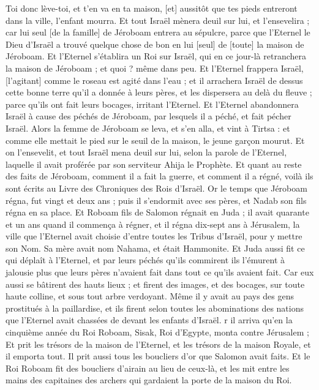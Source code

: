\begin{multicols}{2}
Toi donc lève-toi, et t'en va en ta maison, [et] aussitôt que tes pieds entreront dans la ville, l'enfant mourra.
Et tout Israël mènera deuil sur lui, et l'ensevelira ; car lui seul [de la famille] de Jéroboam entrera au sépulcre, parce que l'Eternel le Dieu d'Israël a trouvé quelque chose de bon en lui [seul] de [toute] la maison de Jéroboam.
Et l'Eternel s'établira un Roi sur Israël, qui en ce jour-là retranchera la maison de Jéroboam ; et quoi ? même dans peu.
Et l'Eternel frappera Israël, [l'agitant] comme le roseau est agité dans l'eau ; et il arrachera Israël de dessus cette bonne terre qu'il a donnée à leurs pères, et les dispersera au delà du fleuve ; parce qu'ils ont fait leurs bocages, irritant l'Eternel.
Et l'Eternel abandonnera Israël à cause des péchés de Jéroboam, par lesquels il a péché, et fait pécher Israël.
Alors la femme de Jéroboam se leva, et s'en alla, et vint à Tirtsa : et comme elle mettait le pied sur le seuil de la maison, le jeune garçon mourut.
Et on l'ensevelit, et tout Israël mena deuil sur lui, selon la parole de l'Eternel, laquelle il avait proférée par son serviteur Ahija le Prophète.
Et quant au reste des faits de Jéroboam, comment il a fait la guerre, et comment il a régné, voilà ils sont écrits au Livre des Chroniques des Rois d'Israël.
Or le temps que Jéroboam régna, fut vingt et deux ans ; puis il s'endormit avec ses pères, et Nadab son fils régna en sa place.
Et Roboam fils de Salomon régnait en Juda ; il avait quarante et un ans quand il commença à régner, et il régna dix-sept ans à Jérusalem, la ville que l'Eternel avait choisie d'entre toutes les Tribus d'Israël, pour y mettre son Nom. Sa mère avait nom Nahama, et était Hammonite.
Et Juda aussi fit ce qui déplaît à l'Eternel, et par leurs péchés qu'ils commirent ils l'émurent à jalousie plus que leurs pères n'avaient fait dans tout ce qu'ils avaient fait.
Car eux aussi se bâtirent des hauts lieux ; et firent des images, et des bocages, sur toute haute colline, et sous tout arbre verdoyant.
Même il y avait au pays des gens prostitués à la paillardise, et ils firent selon toutes les abominations des nations que l'Eternel avait chassées de devant les enfants d'Israël.
r il arriva qu'en la cinquième année du Roi Roboam, Sisak, Roi d'Egypte, monta contre Jérusalem ;
Et prit les trésors de la maison de l'Eternel, et les trésors de la maison Royale, et il emporta tout. Il prit aussi tous les boucliers d'or que Salomon avait faits.
Et le Roi Roboam fit des boucliers d'airain au lieu de ceux-là, et les mit entre les mains des capitaines des archers qui gardaient la porte de la maison du Roi.

\end{multicols}
